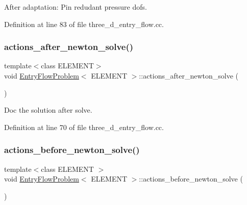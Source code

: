After adaptation\+: Pin redudant pressure dofs. 



Definition at line 83 of file three\+\_\+d\+\_\+entry\+\_\+flow.\+cc.

\mbox{\label{classEntryFlowProblem_a034e6085f31de2c44419090b64d503db}} 
\subsubsection{\texorpdfstring{actions\+\_\+after\+\_\+newton\+\_\+solve()}{actions\_after\_newton\_solve()}}
{\footnotesize\ttfamily template$<$class E\+L\+E\+M\+E\+NT$>$ \\
void \hyperlink{classEntryFlowProblem}{Entry\+Flow\+Problem}$<$ E\+L\+E\+M\+E\+NT $>$\+::actions\+\_\+after\+\_\+newton\+\_\+solve (\begin{DoxyParamCaption}{ }\end{DoxyParamCaption})\hspace{0.3cm}{\ttfamily [inline]}}



Doc the solution after solve. 



Definition at line 70 of file three\+\_\+d\+\_\+entry\+\_\+flow.\+cc.

\mbox{\label{classEntryFlowProblem_ae4dde95573350d8fdb19463849991130}} 
\subsubsection{\texorpdfstring{actions\+\_\+before\+\_\+newton\+\_\+solve()}{actions\_before\_newton\_solve()}}
{\footnotesize\ttfamily template$<$class E\+L\+E\+M\+E\+NT $>$ \\
void \hyperlink{classEntryFlowProblem}{Entry\+Flow\+Problem}$<$ E\+L\+E\+M\+E\+NT $>$\+::actions\+\_\+before\+\_\+newton\+\_\+solve (\begin{DoxyParamCaption}{ }\end{DoxyParamCaption})}



